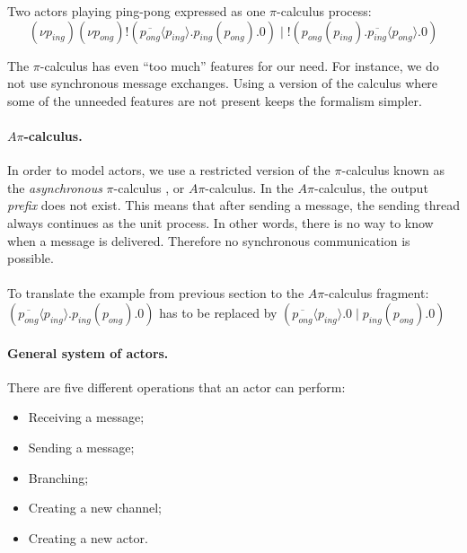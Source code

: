 \documentclass[a4paper]{report}
\numberwithin{algorithm}{chapter}
\begin{document}
\begin{example}
Two actors playing ping-pong expressed as one $\pi$-calculus process:
\begin{equation*}
(\nu p_{ing})(\nu p_{ong}) !( \overline{p_{ong}}\langle p_{ing} \rangle. p_{ing}(p_{ong}). 0 )
                     \;|\; !( p_{ong}(p_{ing}). \overline{p_{ing}}\langle p_{ong} \rangle. 0 )
\end{equation*}
\end{example}


The $\pi$-calculus has even ``too much'' features for our need.
For instance, we do not use synchronous message exchanges.
Using a version of the calculus where some of the unneeded features are not present keeps the formalism simpler.

\paragraph{$A\pi$-calculus.}
In order to model actors, we use a restricted version of the $\pi$-calculus known as the \textit{asynchronous} $\pi$-calculus \cite{DBLP:conf/ecoop/HondaT91,Boudol92asynchronyand}, or $A\pi$-calculus.
In the $A\pi$-calculus, the output \emph{prefix} does not exist.
This means that after sending a message, the sending thread always continues as the unit process.
In other words, there is no way to know when a message is delivered.
Therefore no synchronous communication is possible.

\paragraph{}
To translate the example from previous section to the $A\pi$-calculus fragment:\\
$( \overline{p_{ong}}\langle p_{ing} \rangle. p_{ing}(p_{ong}). 0 )$
has to be replaced by
$( \overline{p_{ong}}\langle p_{ing} \rangle. 0 \;|\; p_{ing}(p_{ong}). 0 )$

\paragraph{General system of actors.}

There are five different operations that an actor can perform:
\begin{itemize}
\item Receiving a message;
\item Sending a message;
\item Branching;
\item Creating a new channel;
\item Creating a new actor.
\end{itemize}
\end{document}
